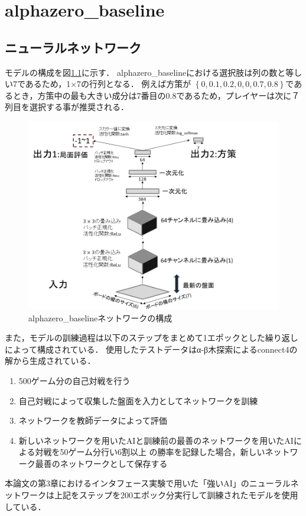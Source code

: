 \chapter{alphazero\_baseline}
\label{chap:baseline}
\section{ニューラルネットワーク}
モデルの構成を図\ref{fig:baselineNetwork}に示す．
alphazero\_baselineにおける選択肢は列の数と等しい7であるため，1$\times$7の行列となる．
例えば方策が
$\left\{0, 0.1, 0.2, 0, 0, 0.7, 0.8\right\}$であるとき，方策中の最も大きい成分は7番目の0.8であるため，プレイヤーは次に７列目を選択する事が推奨される．
\begin{figure}[t]
	\centering
	\includegraphics[width=\linewidth]{./figure/baselineNetwork.png}
	\caption{alphazero\_baselineネットワークの構成}
	\label{fig:baselineNetwork}
\end{figure}
また，モデルの訓練過程は以下のステップをまとめて1エポックとした繰り返しによって構成されている．
使用したテストデータ\cite{dataset}はα-β木探索によるconnect4の解から生成されている\cite{scoring}．
\begin{enumerate}
	\item 500ゲーム分の自己対戦を行う
	\item 自己対戦によって収集した盤面を入力としてネットワークを訓練
    \item ネットワークを教師データによって評価
    \item 新しいネットワークを用いたAIと訓練前の最善のネットワークを用いたAIによる対戦を50ゲーム分行い6割以上
    の勝率を記録した場合，新しいネットワーク最善のネットワークとして保存する

\end{enumerate}
本論文の第3章におけるインタフェース実験で用いた「強いAI」のニューラルネットワークは上記をステップを200エポック分実行して訓練されたモデルを使用している．


